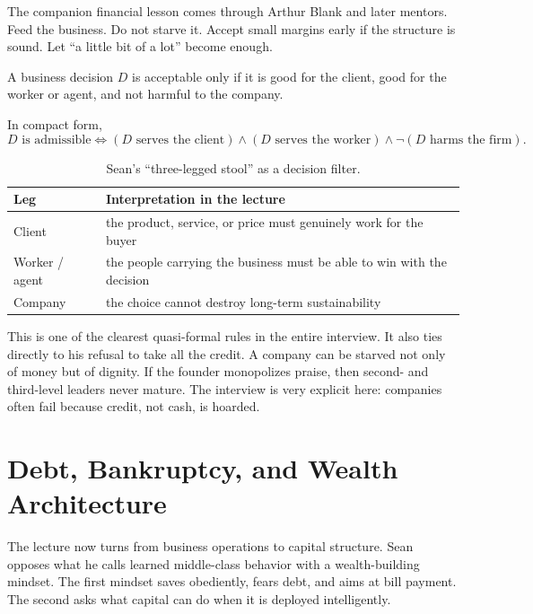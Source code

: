The companion financial lesson comes through Arthur Blank and later mentors. Feed the business. Do not starve it. Accept small margins early if the structure is sound. Let ``a little bit of a lot'' become enough.

\begin{definition}
A business decision \(D\) is acceptable only if it is good for the client, good for the worker or agent, and not harmful to the company.
\end{definition}

In compact form,
\begin{equation}
D \text{ is admissible} \iff (D \text{ serves the client}) \land (D \text{ serves the worker}) \land \neg(D \text{ harms the firm}).
\end{equation}

\begin{table}[h]
\centering
\begin{tabular}{|l|p{8.2cm}|}
\hline
Leg & Interpretation in the lecture \\
\hline
Client & the product, service, or price must genuinely work for the buyer \\
\hline
Worker / agent & the people carrying the business must be able to win with the decision \\
\hline
Company & the choice cannot destroy long-term sustainability \\
\hline
\end{tabular}
\caption{Sean's ``three-legged stool'' as a decision filter.}
\end{table}

This is one of the clearest quasi-formal rules in the entire interview. It also ties directly to his refusal to take all the credit. A company can be starved not only of money but of dignity. If the founder monopolizes praise, then second- and third-level leaders never mature. The interview is very explicit here: companies often fail because credit, not cash, is hoarded.

\section{Debt, Bankruptcy, and Wealth Architecture}

The lecture now turns from business operations to capital structure. Sean opposes what he calls learned middle-class behavior with a wealth-building mindset. The first mindset saves obediently, fears debt, and aims at bill payment. The second asks what capital can do when it is deployed intelligently.


